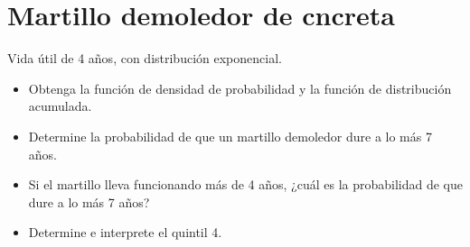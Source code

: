 \documentclass{article}
\begin{document}
\section{Martillo demoledor de cncreta}
Vida útil de 4 años, con distribución exponencial.

\begin{itemize}
  \item Obtenga la función de densidad de probabilidad y la función de distribución acumulada.
  \item Determine la probabilidad de que un martillo demoledor dure a lo más 7 años.
  \item Si el martillo lleva funcionando más de 4 años, ¿cuál es la probabilidad de que dure a lo más 7 años?
  \item Determine e interprete el quintil 4.
\end{itemize}
\end{document}

